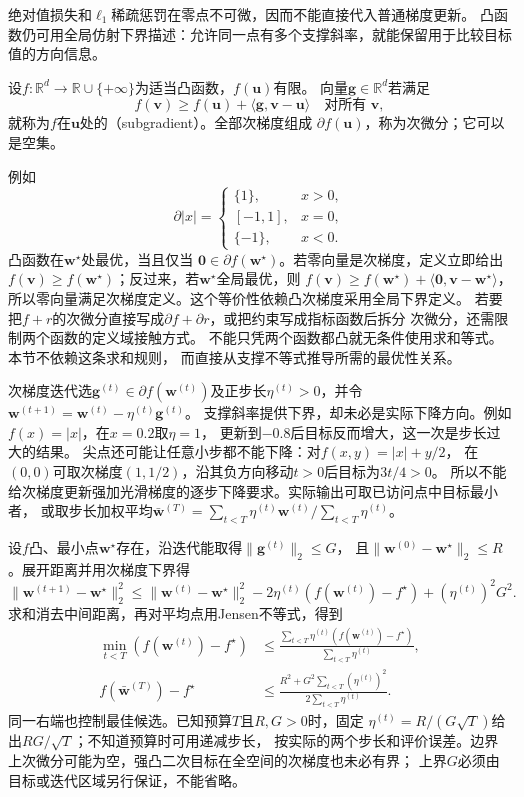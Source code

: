 绝对值损失和$\ell_1$稀疏惩罚在零点不可微，因而不能直接代入普通梯度更新。
凸函数仍可用全局仿射下界描述：允许同一点有多个支撑斜率，就能保留用于比较目标值的方向信息。
\begin{definition}[凸次梯度与次微分]
\label{def:opt-convex-subgradient}
设$f:\mathbb R^d\to\mathbb R\cup\{+\infty\}$为适当凸函数，$f(\bm u)$有限。
向量$\bm{g}\in\mathbb R^d$若满足
\[
  f(\bm{v})\geq f(\bm{u})+\langle\bm{g},\bm{v}-\bm{u}\rangle
  \quad\text{对所有 }\bm{v},
\]
就称为$f$在$\bm{u}$处的（subgradient）。全部次梯度组成
$\partial f(\bm{u})$，称为次微分；它可以是空集。
\end{definition}
例如
\[
  \partial |x|=
  \begin{cases}
    \{1\},&x>0,\\
    [-1,1],&x=0,\\
    \{-1\},&x<0.
  \end{cases}
\]
凸函数在$\bm{w}^{\star}$处最优，当且仅当
$\bm{0}\in\partial f(\bm{w}^{\star})$。若零向量是次梯度，定义立即给出
$f(\bm{v})\geq f(\bm{w}^{\star})$；反过来，若$\bm{w}^{\star}$全局最优，则
$f(\bm{v})\geq f(\bm{w}^{\star})+\langle\bm{0},\bm{v}-\bm{w}^{\star}\rangle$，
所以零向量满足次梯度定义。这个等价性依赖凸次梯度采用全局下界定义。
若要把$f+r$的次微分直接写成$\partial f+\partial r$，或把约束写成指标函数后拆分
次微分，还需限制两个函数的定义域接触方式。
不能只凭两个函数都凸就无条件使用求和等式。本节不依赖这条求和规则，
而直接从支撑不等式推导所需的最优性关系。

次梯度迭代选$\bm g^{(t)}\in\partial f(\bm w^{(t)})$及正步长$\eta^{(t)}>0$，并令
$\bm w^{(t+1)}=\bm w^{(t)}-\eta^{(t)}\bm g^{(t)}$。
支撑斜率提供下界，却未必是实际下降方向。例如$f(x)=|x|$，在$x=0.2$取$\eta=1$，
更新到$-0.8$后目标反而增大，这一次是步长过大的结果。
尖点还可能让任意小步都不能下降：对$f(x,y)=|x|+y/2$，
在$(0,0)$可取次梯度$(1,1/2)$，沿其负方向移动$t>0$后目标为$3t/4>0$。
所以不能给次梯度更新强加光滑梯度的逐步下降要求。实际输出可取已访问点中目标最小者，
或取步长加权平均$\bar{\bm w}^{(T)}=\sum_{t<T}\eta^{(t)}\bm w^{(t)}/\sum_{t<T}\eta^{(t)}$。

设$f$凸、最小点$\bm w^\star$存在，沿迭代能取得$\|\bm g^{(t)}\|_2\leq G$，
且$\|\bm w^{(0)}-\bm w^\star\|_2\leq R$。展开距离并用次梯度下界得
\[
 \|\bm w^{(t+1)}-\bm w^\star\|_2^2
 \leq\|\bm w^{(t)}-\bm w^\star\|_2^2
 -2\eta^{(t)}(f(\bm w^{(t)})-f^\star)+(\eta^{(t)})^2G^2.
\]
求和消去中间距离，再对平均点用Jensen不等式，得到
\begin{equation}
\begin{aligned}
 \min_{t<T}(f(\bm w^{(t)})-f^\star)
 &\leq\frac{\sum_{t<T}\eta^{(t)}(f(\bm w^{(t)})-f^\star)}{\sum_{t<T}\eta^{(t)}},\\
 f(\bar{\bm w}^{(T)})-f^\star
 &\leq\frac{R^2+G^2\sum_{t<T}(\eta^{(t)})^2}{2\sum_{t<T}\eta^{(t)}}.
\end{aligned}
 \label{eq:opt-subgradient-finite-rate}
\end{equation}
同一右端也控制最佳候选。已知预算$T$且$R,G>0$时，固定
$\eta^{(t)}=R/(G\sqrt T)$给出$RG/\sqrt T$；不知道预算时可用递减步长，
按实际的两个步长和评价误差。边界上次微分可能为空，强凸二次目标在全空间的次梯度也未必有界；
上界$G$必须由目标或迭代区域另行保证，不能省略。

